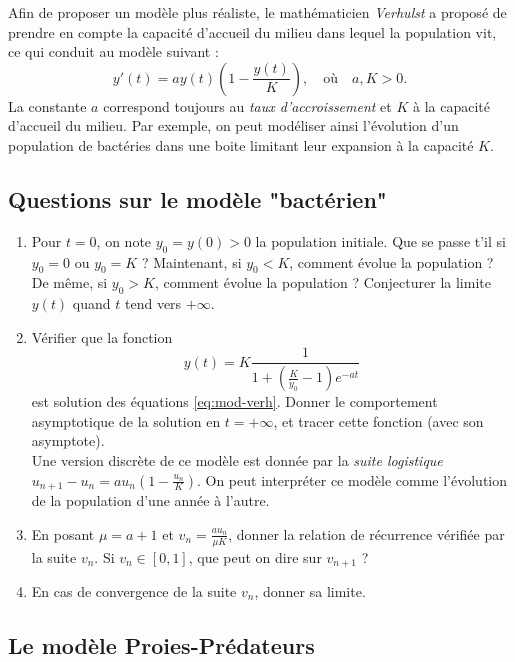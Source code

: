 \documentclass{../ficheTDTP}
\begin{document}
	Afin de proposer un modèle plus réaliste, le mathématicien \textit{Verhulst} a proposé de prendre en compte la capacité d'accueil du milieu dans lequel la population vit, ce qui conduit au modèle suivant :
\begin{equation}\label{eq:mod-verh}
	y'(t) = a y(t) \left( 1 - \dfrac{y(t)}{K} \right), \quad \text{où} \quad a,K >0.
\end{equation}
La constante $a$ correspond toujours au \textit{taux d'accroissement} et $K$ à la capacité d'accueil du milieu. Par exemple, on peut modéliser ainsi l'évolution d'un population de bactéries dans une boite limitant leur expansion à la capacité $K$.\\

\subsection{Questions sur le modèle "bactérien"}
\begin{enumerate}
	\item Pour $t=0$, on note $y_0 = y(0)>0$ la population initiale. Que se passe t'il si $y_0 = 0$ ou $y_0 = K$ ? Maintenant, si $y_0 <K$, comment évolue la population ? De même, si $y_0>K$, comment évolue la population ? Conjecturer la limite $y(t)$ quand $t$ tend vers $+\infty$.
	
	\item Vérifier que la fonction
\[
	y(t) = K \dfrac{1}{1+\left( \frac{K}{y_0} - 1 \right)e^{-a t} }
\]
est solution des équations \eqref{eq:mod-verh}. Donner le comportement asymptotique de la solution en $t=+\infty$, et tracer cette fonction (avec son asymptote).\\

\noindent Une version discrète de ce modèle est donnée par la \textit{suite logistique} $u_{n+1} - u_n = a u_n (1 - \frac{u_n}{K})$. On peut interpréter ce modèle comme l'évolution de la population d'une année à l'autre.\\

\item En posant $\mu = a+1$ et $v_n = \frac{a u_n}{\mu K}$, donner la relation de récurrence vérifiée par la suite $v_n$. Si $v_n \in [0,1]$, que peut on dire sur $v_{n+1}$ ?

\item En cas de convergence de la suite $v_n$, donner sa limite.\\
\end{enumerate}

\subsection{Le modèle Proies-Prédateurs}
\end{document}
